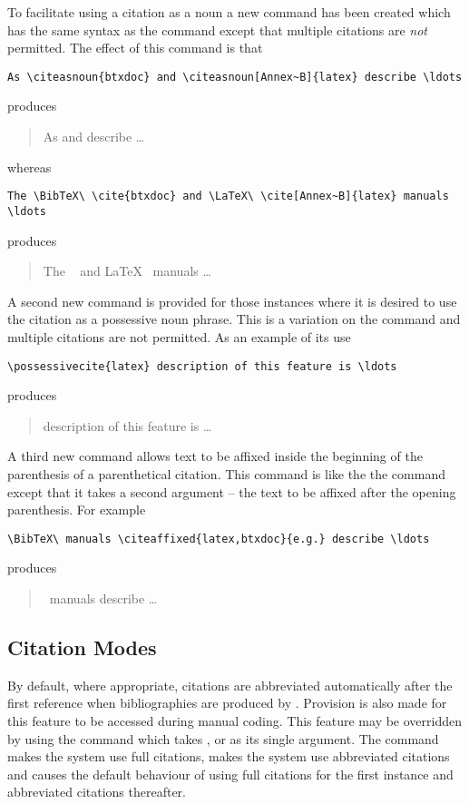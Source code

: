 To facilitate using a citation as a noun a new command
 has been created which has the same syntax as the
 command except that multiple citations are {\em not}
permitted.
The effect of this command is that
\begin{verbatim}
As \citeasnoun{btxdoc} and \citeasnoun[Annex~B]{latex} describe \ldots
\end{verbatim}
produces
\begin{quote}
As  and  describe \ldots
\end{quote}
whereas
\begin{verbatim}
The \BibTeX\ \cite{btxdoc} and \LaTeX\ \cite[Annex~B]{latex} manuals \ldots
\end{verbatim}
produces
\begin{quote}
The \BibTeX\ \cite{JohnB} and \LaTeX\ \cite[Annex~B]{latex} manuals \ldots
\end{quote}
A second new command  is provided for those
instances where it is desired to use the citation as a possessive noun phrase.
This is a variation on the  command and
multiple citations are not permitted.
As an example of its use
\begin{verbatim}
\possessivecite{latex} description of this feature is \ldots
\end{verbatim}
produces
\begin{quote}
 description of this feature is \ldots
\end{quote}
A third new command  allows text to be affixed
inside the beginning of the parenthesis of a parenthetical citation.
This command is like the the  command except that it
takes a second argument -- the text to be affixed after the opening 
parenthesis.
For example
\begin{verbatim}
\BibTeX\ manuals \citeaffixed{latex,btxdoc}{e.g.} describe \ldots
\end{verbatim}
produces
\begin{quote}
\BibTeX\ manuals  describe \ldots
\end{quote}

\subsection{Citation Modes}

By default,
where appropriate, citations are abbreviated automatically after the first
reference when bibliographies are produced by \BibTeX.
Provision is also made for this feature to be accessed during manual coding.
This feature may be overridden by using the 
command which takes ,  or  as its single
argument.
The command  makes the system use
full citations,  makes the system use
abbreviated citations and  causes
the default behaviour of using full citations for the first instance and
abbreviated citations thereafter.

